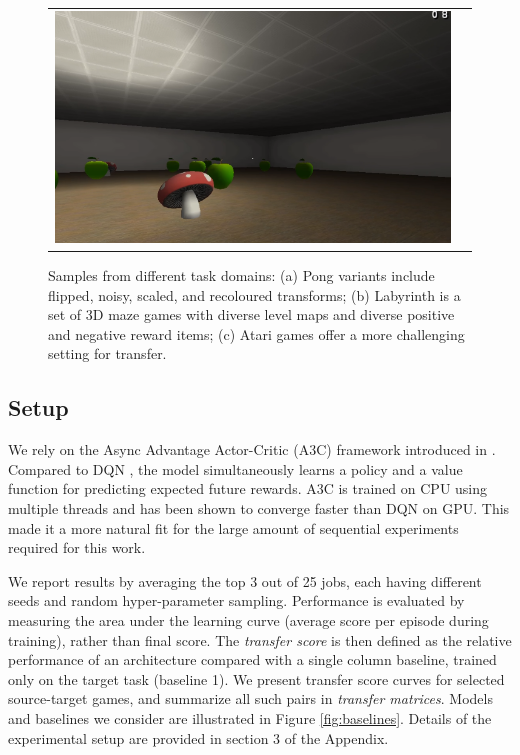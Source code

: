 \begin{figure}[h]
{\begin{tabular}{cc}
  \includegraphics[width=.15\textwidth]{figures/seekavoid_arena_02.png}
\end{tabular}
}
\hfill
\caption{Samples from different task domains: (a) Pong variants include flipped, noisy, scaled, and recoloured transforms; (b) Labyrinth is a set of 3D maze games with diverse level maps and diverse positive and negative reward items; (c) Atari games offer a more challenging setting for transfer.}
\label{fig:datasets}
\end{figure}

\subsection{Setup}

We rely on the Async Advantage Actor-Critic (A3C) framework introduced in
\citep{mnih2016a3c}.  Compared to DQN \citep{mnih-dqn-2015}, the model simultaneously learns
a policy and a value function
for predicting expected future rewards. A3C is trained on CPU using multiple threads
and has been shown to converge faster than DQN on GPU. This made it
a more natural fit for the
large amount of sequential experiments required for this work.

We report results by averaging the top 3 out of 25 jobs, each having
different seeds and random hyper-parameter sampling. Performance is evaluated
by measuring the area under the learning curve (average score per
episode during training), rather than final score. The \emph{transfer score}
is then defined as the relative performance of an architecture compared with
a single column baseline, trained only on the target task (baseline 1). We present transfer
score curves for selected source-target games, and summarize all such pairs in
\emph{transfer matrices}.
Models and baselines we consider are illustrated in Figure \ref{fig:baselines}.
Details of the experimental setup are provided in section 3 of the Appendix.

